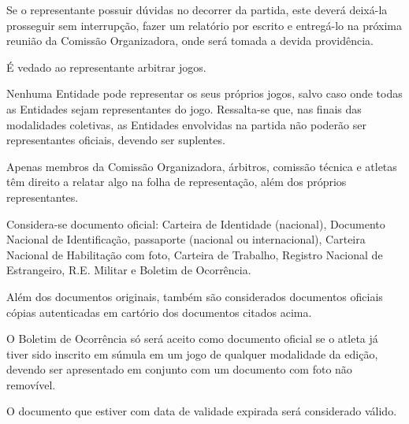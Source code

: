 \begin{article}
	Se o representante possuir dúvidas no decorrer da partida, este deverá deixá-la prosseguir sem interrupção, fazer um relatório por escrito e entregá-lo na próxima reunião da Comissão Organizadora, onde será tomada a devida providência.
\end{article}

\begin{article}
	É vedado ao representante arbitrar jogos.
\end{article}

\begin{article}
	Nenhuma Entidade pode representar os seus próprios jogos, salvo caso onde todas as Entidades sejam representantes do jogo. Ressalta-se que, nas finais das modalidades coletivas, as Entidades envolvidas na partida não poderão ser representantes oficiais, devendo ser suplentes.
\end{article}

\begin{article}
	Apenas membros da Comissão Organizadora, árbitros, comissão técnica e atletas têm direito a relatar algo na folha de representação, além dos próprios representantes.
\end{article}

\begin{article}
    \label{art:documentosoficiais}
	Considera-se documento oficial: Carteira de Identidade (nacional), Documento Nacional de Identificação, passaporte (nacional ou internacional), Carteira Nacional de Habilitação com foto, Carteira de Trabalho, Registro Nacional de Estrangeiro, R.E. Militar e Boletim de Ocorrência.

	\begin{xparagraph}
	    Além dos documentos originais, também são considerados documentos oficiais cópias autenticadas em cartório dos documentos citados acima.
	\end{xparagraph}

	\begin{xparagraph}
	    O Boletim de Ocorrência só será aceito como documento oficial se o atleta já tiver sido inscrito em súmula em um jogo de qualquer modalidade da edição, devendo ser apresentado em conjunto com um documento com foto não removível.
	\end{xparagraph}

	\begin{xparagraph}
	    O documento que estiver com data de validade expirada será considerado válido.
	\end{xparagraph}
\end{article}